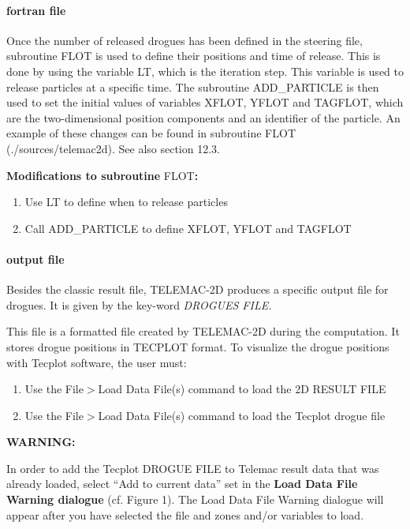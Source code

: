 \documentclass{article} %
\begin{document}
\paragraph{ fortran file}

 Once the number of released drogues has been defined in the steering file, subroutine FLOT is used to define their positions and time of release. This is done by using the variable LT, which is the iteration step. This variable is used to release particles at a specific time. The subroutine ADD\_PARTICLE is then used to set the initial values of variables XFLOT, YFLOT and TAGFLOT, which are the two-dimensional position components and an identifier of the particle. An example of these changes can be found in subroutine FLOT (./sources/telemac2d). See also section 12.3.

 \textbf{Modifications to subroutine }FLOT\textbf{:}

\begin{enumerate}
\item \textbf{ }Use LT to define when to release particles

\item  Call ADD\_PARTICLE to define XFLOT, YFLOT and TAGFLOT
\end{enumerate}


\paragraph{ output file}

 Besides the classic result file, TELEMAC-2D produces a specific output file for drogues. It is given by the key-word \textit{DROGUES FILE. }

 This file is a formatted file created by TELEMAC-2D during the computation. It stores drogue positions in TECPLOT format. To visualize the drogue positions with Tecplot software, the user must:

\begin{enumerate}
\item  Use the File$>$Load Data File(s) command to load the 2D RESULT FILE

\item  Use the File$>$Load Data File(s) command to load the Tecplot drogue file
\end{enumerate}

 \textbf{WARNING:}

 In order to add the Tecplot DROGUE FILE to Telemac result data that was already loaded, select ``Add to current data'' set in the \textbf{Load Data File Warning dialogue} (cf. Figure 1). The Load Data File Warning dialogue will appear after you have selected the file and zones and/or variables to load.
\end{document}
